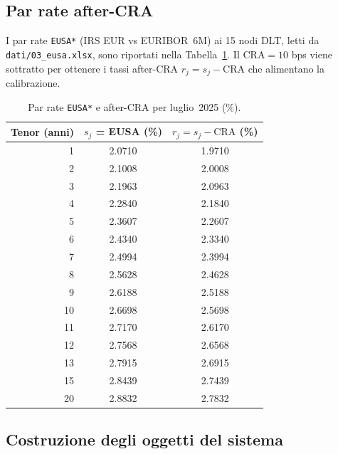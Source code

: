 \documentclass[11pt,a4paper]{article}
\theoremstyle{plain}
\theoremstyle{definition}
\theoremstyle{remark}
\newcommand{\CRA}{\ensuremath{\mathrm{CRA}}}
\begin{document}
\subsection{Par rate after-CRA}

I par rate \texttt{EUSA*} (IRS EUR vs EURIBOR~6M) ai 15 nodi DLT, letti da
\texttt{dati/03\_eusa.xlsx}, sono riportati nella Tabella~\ref{tab:input-jul}.
Il $\CRA = 10$ bps viene sottratto per ottenere i tassi after-CRA $r_j = s_j - \CRA$
che alimentano la calibrazione.

\begin{table}[H]
\centering\small
\caption{Par rate \texttt{EUSA*} e after-CRA per luglio~2025 (\%).}
\label{tab:input-jul}
\renewcommand{\arraystretch}{1.15}
\begin{tabular}{rcc}
\toprule
\textbf{Tenor} (anni) & $s_j$ = EUSA (\%) & $r_j = s_j - \CRA$ (\%)\\
\midrule
 1  & 2.0710 & 1.9710\\
 2  & 2.1008 & 2.0008\\
 3  & 2.1963 & 2.0963\\
 4  & 2.2840 & 2.1840\\
 5  & 2.3607 & 2.2607\\
 6  & 2.4340 & 2.3340\\
 7  & 2.4994 & 2.3994\\
 8  & 2.5628 & 2.4628\\
 9  & 2.6188 & 2.5188\\
10  & 2.6698 & 2.5698\\
11  & 2.7170 & 2.6170\\
12  & 2.7568 & 2.6568\\
13  & 2.7915 & 2.6915\\
15  & 2.8439 & 2.7439\\
20  & 2.8832 & 2.7832\\
\bottomrule
\end{tabular}
\end{table}

\subsection{Costruzione degli oggetti del sistema}
\end{document}
